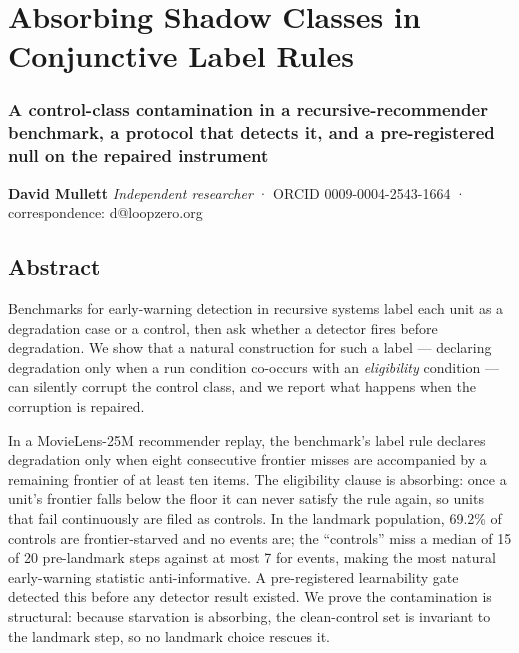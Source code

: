 \documentclass[
  11pt,
]{article}
\author{}
\date{}
\begin{document}
\section{Absorbing Shadow Classes in Conjunctive Label
Rules}\label{absorbing-shadow-classes-in-conjunctive-label-rules}

\subsubsection{A control-class contamination in a recursive-recommender
benchmark, a protocol that detects it, and a pre-registered null on the
repaired
instrument}\label{a-control-class-contamination-in-a-recursive-recommender-benchmark-a-protocol-that-detects-it-and-a-pre-registered-null-on-the-repaired-instrument}

\textbf{David Mullett} \emph{Independent researcher} · ORCID
0009-0004-2543-1664 · correspondence: d@loopzero.org

\subsection{Abstract}\label{abstract}

Benchmarks for early-warning detection in recursive systems label each
unit as a degradation case or a control, then ask whether a detector
fires before degradation. We show that a natural construction for such a
label --- declaring degradation only when a run condition co-occurs with
an \emph{eligibility} condition --- can silently corrupt the control
class, and we report what happens when the corruption is repaired.

In a MovieLens-25M recommender replay, the benchmark's label rule
declares degradation only when eight consecutive frontier misses are
accompanied by a remaining frontier of at least ten items. The
eligibility clause is absorbing: once a unit's frontier falls below the
floor it can never satisfy the rule again, so units that fail
continuously are filed as controls. In the landmark population, 69.2\%
of controls are frontier-starved and no events are; the ``controls''
miss a median of 15 of 20 pre-landmark steps against at most 7 for
events, making the most natural early-warning statistic
anti-informative. A pre-registered learnability gate detected this
before any detector result existed. We prove the contamination is
structural: because starvation is absorbing, the clean-control set is
invariant to the landmark step, so no landmark choice rescues it.
\end{document}
